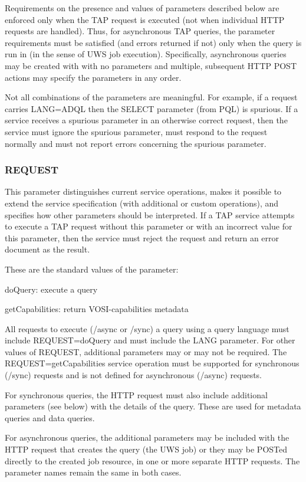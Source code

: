 \documentclass[11pt,a4paper]{ivoa}
\begin{document}
Requirements on the presence and values of parameters described below are 
enforced only when the TAP request is executed (not when individual HTTP 
requests are handled). Thus, for asynchronous TAP queries, the parameter 
requirements must be satisfied (and errors returned if not) only when the query 
is run in (in the sense of UWS job execution). Specifically, asynchronous 
queries may be created with with no parameters and multiple, subsequent HTTP 
POST actions may specify the parameters in any order.

Not all combinations of the parameters are meaningful. For example, if a request 
carries  LANG=ADQL then the SELECT parameter (from PQL) is spurious. If a 
service receives a spurious parameter in an otherwise correct request, then the 
service must ignore the spurious parameter, must respond to the request normally 
and must not report errors concerning the  spurious parameter.

\subsubsection{REQUEST}
This parameter distinguishes current service operations, makes it possible to 
extend the service specification (with additional or custom operations), and 
specifies how other parameters should be interpreted. If a TAP service attempts 
to execute a TAP request without this parameter or with an incorrect value for 
this parameter, then the service must reject the request and return an error 
document as the result.

These are the standard values of the parameter:

doQuery: execute a query 

getCapabilities: return VOSI-capabilities metadata 

All requests to execute (/async or /sync) a query using a query language must 
include REQUEST=doQuery and must include the LANG parameter. For other values of 
REQUEST, additional parameters may or may not be required. The 
REQUEST=getCapabilities service operation must be supported for synchronous 
(/sync) requests and is not defined for asynchronous (/async) requests.

For synchronous queries, the HTTP request must also include additional 
parameters (see below) with the details of the query. These are used for 
metadata queries and data queries.

For asynchronous queries, the additional parameters may be included with the 
HTTP request that creates the query (the UWS job) or they may be POSTed directly 
to the created job resource, in one or more separate HTTP requests. The 
parameter names remain the same in both cases.
\end{document}
